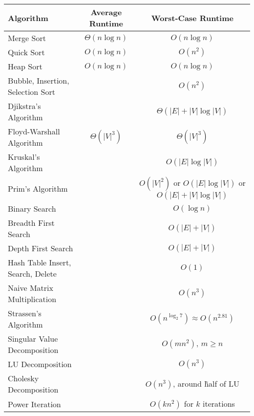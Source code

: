 \documentclass[border=2pt]{standalone}
\begin{document}
\begin{tabular}{|l|c|c|}
    \hline 
    Algorithm & Average Runtime & Worst-Case Runtime \\ 
    \hline
    Merge Sort & $\Theta(n\log n)$ & $O(n \log n)$ \\ 
    Quick Sort & $O(n \log n)$ & $O(n^2)$ \\
    Heap Sort & $O(n \log n)$ & $O(n \log n)$ \\
    Bubble, Insertion, Selection Sort & & $O(n^2)$ \\
    Djikstra's Algorithm & & $\Theta(|E| + |V| \log |V|)$ \\
    Floyd-Warshall Algorithm & $\Theta(|V|^3)$ & $\Theta(|V|^3)$ \\ 
    Kruskal's Algorithm & & $O(|E| \log |V|)$ \\
    Prim's Algorithm & & $O(|V|^2)$ or $O(|E| \log |V|)$ or $O(|E| + |V| \log |V|)$ \\ 
    Binary Search & & $O(\log n)$ \\
    Breadth First Search & & $O(|E| + |V|)$ \\
    Depth First Search & & $O(|E| + |V|)$ \\
    Hash Table Insert, Search, Delete & & $O(1)$ \\
    Naive Matrix Multiplication & & $O(n^3)$ \\
    Strassen's Algorithm & & $O(n^{\log_2 7}) \approx O(n^{2.81})$ \\
    Singular Value Decomposition & & $O(mn^2), \, m \geq n$ \\ 
    LU Decomposition & & $O(n^3)$ \\
    Cholesky Decomposition & & $O(n^3)$, around \~half of LU \\
    Power Iteration & & $O(k n^2)$ for $k$ iterations \\
    \hline
\end{tabular}
\end{document}
